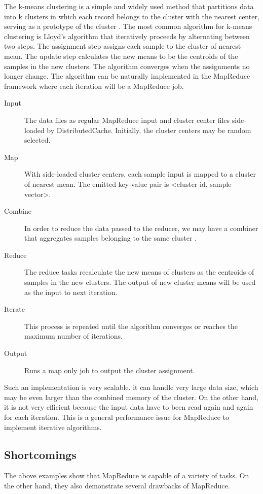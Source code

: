 \documentclass[11pt]{book}
\begin{document}
The k-means clustering is a simple and widely used method that partitions data into k clusters in which each record belongs to the cluster with the nearest center, serving as a prototype of the cluster \cite{Jain:1988:ACD}. The most common algorithm for k-means clustering is Lloyd's algorithm that iteratively proceeds by alternating between two steps. The assignment step assigns each sample to the cluster of nearest mean. The update step calculates the new means to be the centroids of the samples in the new clusters. The algorithm converges when the assignments no longer change. The algorithm can be naturally implemented in the MapReduce framework where each iteration will be a MapReduce job.
\begin{description}
\item[Input] The data files as regular MapReduce input and cluster center files side-loaded by DistributedCache. Initially, the cluster centers may be random selected.
\item[Map] With side-loaded cluster centers, each sample input is mapped to a cluster of nearest mean. The emitted key-value pair is \textless cluster id, sample vector\textgreater.
\item[Combine] In order to reduce the data passed to the reducer, we may have a combiner that aggregates samples belonging to the same cluster .
\item[Reduce] The reduce tasks recalculate the new means of clusters as the centroids of samples in the new clusters. The output of new cluster means will be used as the input to next iteration.
\item[Iterate] This process is repeated until the algorithm converges or reaches the maximum number of iterations.
\item[Output] Runs a map only job to output the cluster assignment.
\end{description}

Such an implementation is very scalable. it can handle very large data size, which may be even larger than the combined memory of the cluster. On the other hand, it is not very efficient because the input data have to been read again and again for each iteration. This is a general performance issue for MapReduce to implement iterative algorithms.
 
\subsection{Shortcomings}
The above examples show that MapReduce is capable of a variety of tasks. On the other hand, they also demonstrate several drawbacks of MapReduce.
\end{document}
